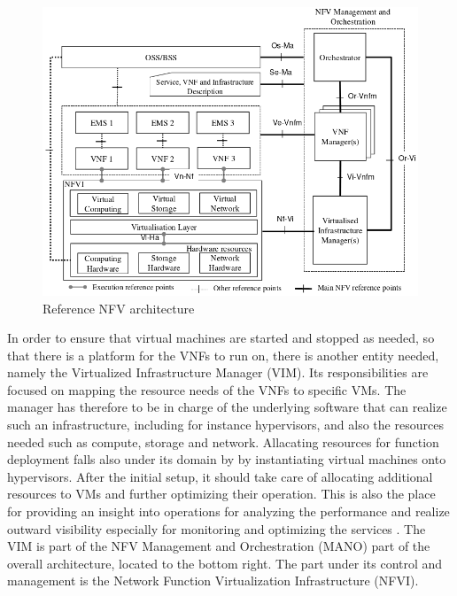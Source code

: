 \begin{figure}[H]
	\centering
	\includegraphics[width=1\linewidth]{images/nfv_ref_arch.png}
	\caption{Reference NFV architecture \cite{etsi1etsi}}
	\label{img:nfv_ref_arch}
\end{figure}

In order to ensure that virtual machines are started and stopped as needed, so that there is a platform for the VNFs to run on, there is another entity needed, namely the Virtualized Infrastructure Manager (VIM). Its responsibilities are focused on mapping the resource needs of the VNFs to specific VMs. The manager has therefore to be in charge of the underlying software that can realize such an infrastructure, including for instance hypervisors, and also the resources needed such as compute, storage and network. Allacating resources for function deployment falls also under its domain by by instantiating virtual machines onto hypervisors. After the initial setup, it should take care of allocating additional resources to VMs and further optimizing their operation. This is also the place for providing an insight into operations for analyzing the performance and realize outward visibility especially for monitoring and optimizing the services \cite{nfv_etsi}. 
The VIM is part of the NFV Management and Orchestration (MANO) part of the overall architecture, located to the bottom right. The part under its control and management is the Network Function Virtualization Infrastructure (NFVI).

